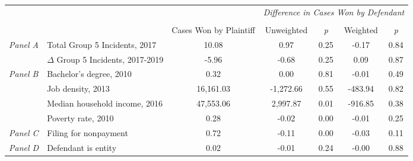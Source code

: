 \begin{tabular}{llccccc}
\toprule
 &  & \textit{} & \multicolumn{4}{c}{\textit{Difference in Cases Won by Defendant}} \\
\cline{4-7}
\\
 &  & Cases Won by Plaintiff & Unweighted & \emph{p} & Weighted & \emph{p} \\
\midrule
\multirow[c]{2}{.75cm}{\textit{Panel A}} & Total Group 5 Incidents, 2017 & 10.08 & 0.97 & 0.25 & -0.17 & 0.84 \\
 & $\Delta$ Group 5 Incidents, 2017-2019 & -5.96 & -0.68 & 0.25 & 0.09 & 0.87 \\
\cline{1-7}
\multirow[c]{4}{.75cm}{\textit{Panel B}} & Bachelor's degree, 2010 & 0.32 & 0.00 & 0.81 & -0.01 & 0.49 \\
 & Job density, 2013 & 16,161.03 & -1,272.66 & 0.55 & -483.94 & 0.82 \\
 & Median household income, 2016 & 47,553.06 & 2,997.87 & 0.01 & -916.85 & 0.38 \\
 & Poverty rate, 2010 & 0.28 & -0.02 & 0.00 & -0.01 & 0.25 \\
\cline{1-7}
\textit{Panel C} & Filing for nonpayment & 0.72 & -0.11 & 0.00 & -0.03 & 0.11 \\
\cline{1-7}
\textit{Panel D} & Defendant is entity & 0.02 & -0.01 & 0.24 & -0.00 & 0.88 \\
\cline{1-7}
\bottomrule
\end{tabular}
